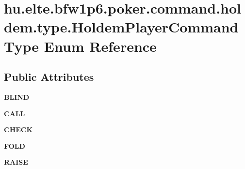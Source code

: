 \hypertarget{enumhu_1_1elte_1_1bfw1p6_1_1poker_1_1command_1_1holdem_1_1type_1_1_holdem_player_command_type}{}\section{hu.\+elte.\+bfw1p6.\+poker.\+command.\+holdem.\+type.\+Holdem\+Player\+Command\+Type Enum Reference}
\label{enumhu_1_1elte_1_1bfw1p6_1_1poker_1_1command_1_1holdem_1_1type_1_1_holdem_player_command_type}
\subsection*{Public Attributes}
\begin{DoxyCompactItemize}
\item 
\hypertarget{enumhu_1_1elte_1_1bfw1p6_1_1poker_1_1command_1_1holdem_1_1type_1_1_holdem_player_command_type_ae3ca97cb15b45588c5e91a4d3bc306b1}{}{\bfseries B\+L\+I\+N\+D}\label{enumhu_1_1elte_1_1bfw1p6_1_1poker_1_1command_1_1holdem_1_1type_1_1_holdem_player_command_type_ae3ca97cb15b45588c5e91a4d3bc306b1}

\item 
\hypertarget{enumhu_1_1elte_1_1bfw1p6_1_1poker_1_1command_1_1holdem_1_1type_1_1_holdem_player_command_type_a3b6fc5a372a78f8224a2c3b2ee148a3a}{}{\bfseries C\+A\+L\+L}\label{enumhu_1_1elte_1_1bfw1p6_1_1poker_1_1command_1_1holdem_1_1type_1_1_holdem_player_command_type_a3b6fc5a372a78f8224a2c3b2ee148a3a}

\item 
\hypertarget{enumhu_1_1elte_1_1bfw1p6_1_1poker_1_1command_1_1holdem_1_1type_1_1_holdem_player_command_type_a491caee1e107e93469d4ea71f4517c15}{}{\bfseries C\+H\+E\+C\+K}\label{enumhu_1_1elte_1_1bfw1p6_1_1poker_1_1command_1_1holdem_1_1type_1_1_holdem_player_command_type_a491caee1e107e93469d4ea71f4517c15}

\item 
\hypertarget{enumhu_1_1elte_1_1bfw1p6_1_1poker_1_1command_1_1holdem_1_1type_1_1_holdem_player_command_type_a5b9b93420793a093398d57796859dba7}{}{\bfseries F\+O\+L\+D}\label{enumhu_1_1elte_1_1bfw1p6_1_1poker_1_1command_1_1holdem_1_1type_1_1_holdem_player_command_type_a5b9b93420793a093398d57796859dba7}

\item 
\hypertarget{enumhu_1_1elte_1_1bfw1p6_1_1poker_1_1command_1_1holdem_1_1type_1_1_holdem_player_command_type_afaee3788285d4c6e7face8eade088f41}{}{\bfseries R\+A\+I\+S\+E}\label{enumhu_1_1elte_1_1bfw1p6_1_1poker_1_1command_1_1holdem_1_1type_1_1_holdem_player_command_type_afaee3788285d4c6e7face8eade088f41}

\end{DoxyCompactItemize}



